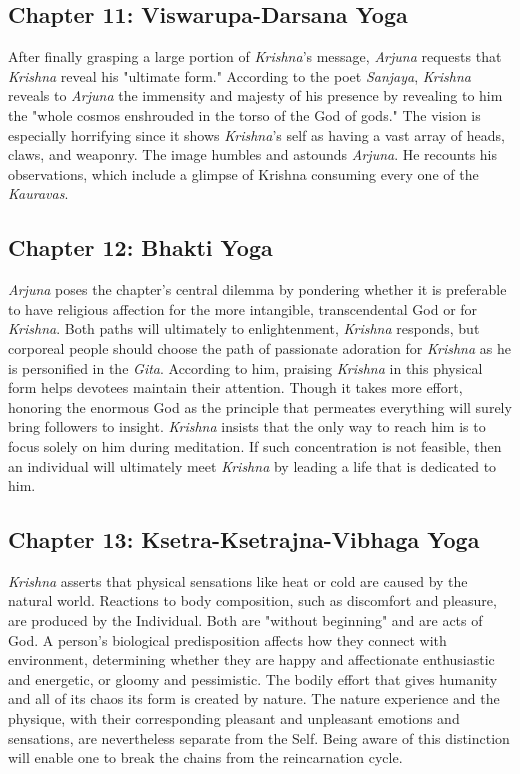 \documentclass[runningheads]{llncs}
\begin{document}
\subsection{Chapter 11: Viswarupa-Darsana Yoga}
After finally grasping a large portion of \textit{Krishna}'s message, \textit{Arjuna} requests that \textit{Krishna} reveal his "ultimate form." According to the poet \textit{Sanjaya}, \textit{Krishna} reveals to \textit{Arjuna} the immensity and majesty of his presence by revealing to him the "whole cosmos enshrouded in the torso of the God of gods." The vision is especially horrifying since it shows \textit{Krishna}'s self as having a vast array of heads, claws, and weaponry. The image humbles and astounds \textit{Arjuna}. He recounts his observations, which include a glimpse of Krishna consuming every one of the \textit{Kauravas}.
\subsection{Chapter 12: Bhakti Yoga}
\textit{Arjuna} poses the chapter's central dilemma by pondering whether it is preferable to have religious affection for the more intangible, transcendental God or for \textit{Krishna}. Both paths will ultimately to enlightenment, \textit{Krishna} responds, but corporeal people should choose the path of passionate adoration for \textit{Krishna} as he is personified in the \textit{Gita}. According to him, praising \textit{Krishna} in this physical form helps devotees maintain their attention. Though it takes more effort, honoring the enormous God as the principle that permeates everything will surely bring followers to insight. \textit{Krishna} insists that the only way to reach him is to focus solely on him during meditation. If such concentration is not feasible, then an individual will ultimately meet \textit{Krishna} by leading a life that is dedicated to him.
\subsection{Chapter 13: 	Ksetra-Ksetrajna-Vibhaga Yoga}
\textit{Krishna} asserts that physical sensations like heat or cold are caused by the natural world. Reactions to body composition, such as discomfort and pleasure, are produced by the Individual. Both are "without beginning" and are acts of God. A person's biological predisposition affects how they connect with environment, determining whether they are happy and affectionate enthusiastic and energetic, or gloomy and pessimistic. The bodily effort that gives humanity and all of its chaos its form is created by nature. The nature experience and the physique, with their corresponding pleasant and unpleasant emotions and sensations, are nevertheless separate from the Self. Being aware of this distinction will enable one to break the chains from the reincarnation cycle.
\end{document}
